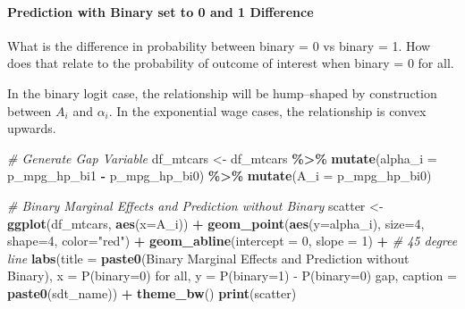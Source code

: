 \documentclass[
]{book}
\newenvironment{Shaded}{\begin{snugshade}}{\end{snugshade}}
\newcommand{\CommentTok}[1]{\textcolor[rgb]{0.56,0.35,0.01}{\textit{#1}}}
\newcommand{\DataTypeTok}[1]{\textcolor[rgb]{0.13,0.29,0.53}{#1}}
\newcommand{\DecValTok}[1]{\textcolor[rgb]{0.00,0.00,0.81}{#1}}
\newcommand{\KeywordTok}[1]{\textcolor[rgb]{0.13,0.29,0.53}{\textbf{#1}}}
\newcommand{\NormalTok}[1]{#1}
\newcommand{\OperatorTok}[1]{\textcolor[rgb]{0.81,0.36,0.00}{\textbf{#1}}}
\newcommand{\StringTok}[1]{\textcolor[rgb]{0.31,0.60,0.02}{#1}}
\begin{document}
\hypertarget{prediction-with-binary-set-to-0-and-1-difference}{%
\paragraph{Prediction with Binary set to 0 and 1 Difference}\label{prediction-with-binary-set-to-0-and-1-difference}}

What is the difference in probability between binary = 0 vs binary = 1. How does that relate to the probability of outcome of interest when binary = 0 for all.

In the binary logit case, the relationship will be hump--shaped by construction between \(A_i\) and \(\alpha_i\). In the exponential wage cases, the relationship is convex upwards.

\begin{Shaded}
\begin{Highlighting}[]
\CommentTok{\# Generate Gap Variable}
\NormalTok{df\_mtcars \textless{}{-}}\StringTok{ }\NormalTok{df\_mtcars }\OperatorTok{\%\textgreater{}\%}\StringTok{ }\KeywordTok{mutate}\NormalTok{(}\DataTypeTok{alpha\_i =}\NormalTok{ p\_mpg\_hp\_bi1 }\OperatorTok{{-}}\StringTok{ }\NormalTok{p\_mpg\_hp\_bi0) }\OperatorTok{\%\textgreater{}\%}
\StringTok{                }\KeywordTok{mutate}\NormalTok{(}\DataTypeTok{A\_i =}\NormalTok{ p\_mpg\_hp\_bi0)}

\CommentTok{\# Binary Marginal Effects and Prediction without Binary}
\NormalTok{scatter \textless{}{-}}\StringTok{ }\KeywordTok{ggplot}\NormalTok{(df\_mtcars, }\KeywordTok{aes}\NormalTok{(}\DataTypeTok{x=}\NormalTok{A\_i)) }\OperatorTok{+}
\StringTok{      }\KeywordTok{geom\_point}\NormalTok{(}\KeywordTok{aes}\NormalTok{(}\DataTypeTok{y=}\NormalTok{alpha\_i), }\DataTypeTok{size=}\DecValTok{4}\NormalTok{, }\DataTypeTok{shape=}\DecValTok{4}\NormalTok{, }\DataTypeTok{color=}\StringTok{"red"}\NormalTok{) }\OperatorTok{+}
\StringTok{      }\KeywordTok{geom\_abline}\NormalTok{(}\DataTypeTok{intercept =} \DecValTok{0}\NormalTok{, }\DataTypeTok{slope =} \DecValTok{1}\NormalTok{) }\OperatorTok{+}\StringTok{ }\CommentTok{\# 45 degree line}
\StringTok{      }\KeywordTok{labs}\NormalTok{(}\DataTypeTok{title =} \KeywordTok{paste0}\NormalTok{(}\StringTok{\textquotesingle{}Binary Marginal Effects and Prediction without Binary\textquotesingle{}}\NormalTok{),}
           \DataTypeTok{x =} \StringTok{\textquotesingle{}P(binary=0) for all\textquotesingle{}}\NormalTok{,}
           \DataTypeTok{y =} \StringTok{\textquotesingle{}P(binary=1) {-} P(binary=0) gap\textquotesingle{}}\NormalTok{,}
           \DataTypeTok{caption =} \KeywordTok{paste0}\NormalTok{(sdt\_name)) }\OperatorTok{+}
\StringTok{      }\KeywordTok{theme\_bw}\NormalTok{()}
\KeywordTok{print}\NormalTok{(scatter)}
\end{Highlighting}
\end{Shaded}
\end{document}
